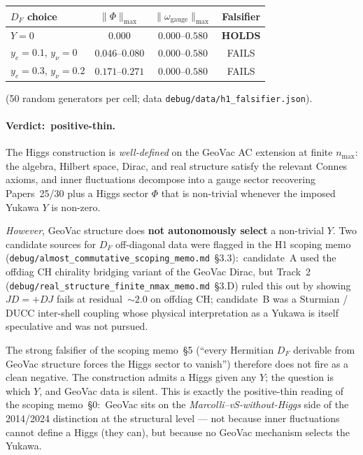 \documentclass[11pt]{article}
\begin{document}
\begin{center}
\begin{tabular}{lccc}
\hline
$D_F$ choice & $\|\Phi\|_{\max}$ & $\|\omega_{\mathrm{gauge}}\|_{\max}$ &
\textbf{Falsifier} \\
\hline
$Y = 0$           &  $0.000$ &  $0.000$--$0.580$ & \textbf{HOLDS}  \\
$y_e = 0.1$, $y_\nu = 0$ & $0.046$--$0.080$ & $0.000$--$0.580$ & FAILS \\
$y_e = 0.3$, $y_\nu = 0.2$ & $0.171$--$0.271$ & $0.000$--$0.580$ & FAILS \\
\hline
\end{tabular}
\end{center}

(50 random generators per cell; data
\texttt{debug/data/h1\_falsifier.json}).

\paragraph{Verdict:\ positive-thin.}  The Higgs construction is
\emph{well-defined} on the GeoVac AC extension at finite $n_{\max}$:
the algebra, Hilbert space, Dirac, and real structure satisfy the
relevant Connes axioms, and inner fluctuations decompose into a
gauge sector recovering Papers~25/30 plus a Higgs sector $\Phi$ that
is non-trivial whenever the imposed Yukawa $Y$ is non-zero.

\emph{However}, GeoVac structure does \textbf{not autonomously
select} a non-trivial $Y$.  Two candidate sources for $D_F$
off-diagonal data were flagged in the H1 scoping memo
(\texttt{debug/almost\_commutative\_scoping\_memo.md}~\S 3.3):\
candidate~A used the offdiag CH chirality bridging variant of
the GeoVac Dirac, but Track~2 (\texttt{debug/real\_structure\_finite\_nmax\_memo.md}~\S 3.D) ruled this out by showing $J D = +D J$ fails at residual~$\sim 2.0$ on offdiag CH; candidate~B was a Sturmian / DUCC inter-shell coupling whose physical interpretation as a Yukawa is itself speculative and was not pursued.

The strong falsifier of the scoping memo~\S 5
(``every Hermitian $D_F$ derivable from GeoVac structure forces
the Higgs sector to vanish'') therefore does not fire as a clean
negative.  The construction admits a Higgs given any $Y$; the
question is which $Y$, and GeoVac data is silent.  This is
exactly the positive-thin reading of the scoping memo~\S 0:\
GeoVac sits on the \emph{Marcolli--vS-without-Higgs} side of the
2014/2024 distinction at the structural level --- not because
inner fluctuations cannot define a Higgs (they can), but because
no GeoVac mechanism selects the Yukawa.
\end{document}
